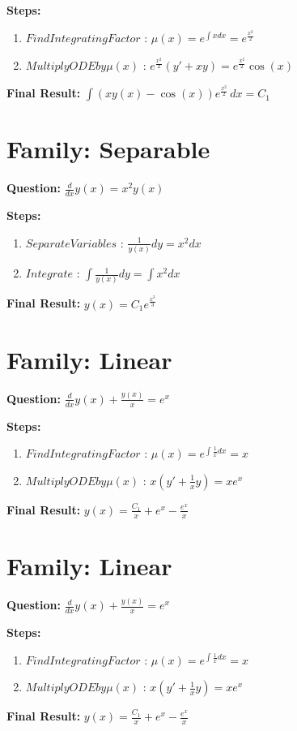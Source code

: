 \documentclass{article}
\begin{document}
\textbf{Steps:}
\begin{enumerate}
\item $Find Integrating Factor$ :  $\mu(x) = e^{\int x dx} = e^{\frac{x^{2}}{2}}$
\item $Multiply ODE by \mu(x)$ :  $e^{\frac{x^{2}}{2}}(y' + xy) = e^{\frac{x^{2}}{2}} \cos{\left(x \right)}$
\end{enumerate}
\textbf{Final Result:} $\int \left(x y{\left(x \right)} - \cos{\left(x \right)}\right) e^{\frac{x^{2}}{2}}\, dx = C_{1}$

\section*{Family: Separable}
\textbf{Question:} $\frac{d}{d x} y{\left(x \right)} = x^{2} y{\left(x \right)}$

\textbf{Steps:}
\begin{enumerate}
\item $Separate Variables$ :  $\frac{1}{y{\left(x \right)}} dy = x^{2} dx$
\item $Integrate$ :  $\int \frac{1}{y{\left(x \right)}} dy = \int x^{2} dx$
\end{enumerate}
\textbf{Final Result:} $y{\left(x \right)} = C_{1} e^{\frac{x^{3}}{3}}$

\section*{Family: Linear}
\textbf{Question:} $\frac{d}{d x} y{\left(x \right)} + \frac{y{\left(x \right)}}{x} = e^{x}$

\textbf{Steps:}
\begin{enumerate}
\item $Find Integrating Factor$ :  $\mu(x) = e^{\int \frac{1}{x} dx} = x$
\item $Multiply ODE by \mu(x)$ :  $x(y' + \frac{1}{x}y) = x e^{x}$
\end{enumerate}
\textbf{Final Result:} $y{\left(x \right)} = \frac{C_{1}}{x} + e^{x} - \frac{e^{x}}{x}$

\section*{Family: Linear}
\textbf{Question:} $\frac{d}{d x} y{\left(x \right)} + \frac{y{\left(x \right)}}{x} = e^{x}$

\textbf{Steps:}
\begin{enumerate}
\item $Find Integrating Factor$ :  $\mu(x) = e^{\int \frac{1}{x} dx} = x$
\item $Multiply ODE by \mu(x)$ :  $x(y' + \frac{1}{x}y) = x e^{x}$
\end{enumerate}
\textbf{Final Result:} $y{\left(x \right)} = \frac{C_{1}}{x} + e^{x} - \frac{e^{x}}{x}$
\end{document}
